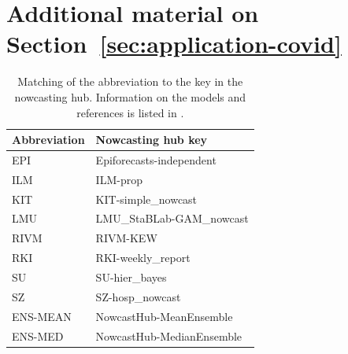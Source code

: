 \section{Additional material on Section~\ref{sec:application-covid}}\label{sec:appendix-application-covid}




\begin{table}
    \centering
    \begin{tabular}{l l}
        \toprule
        Abbreviation & Nowcasting hub key \\
        \midrule
        EPI & Epiforecasts-independent \\
        ILM & ILM-prop \\
        KIT & KIT-simple\_nowcast \\
        LMU & LMU\_StaBLab-GAM\_nowcast \\
        RIVM & RIVM-KEW \\
        RKI & RKI-weekly\_report \\
        SU & SU-hier\_bayes \\
        SZ & SZ-hosp\_nowcast\\
        ENS-MEAN & NowcastHub-MeanEnsemble\\
        ENS-MED & NowcastHub-MedianEnsemble\\
        \bottomrule
    \end{tabular}
    \caption{Matching of the abbreviation to the key in the nowcasting hub.
    Information on the models and references is listed in \textcite[][Table 1]{Wolffram2023}.}
    \label{tab:app-covid-models}
\end{table}


